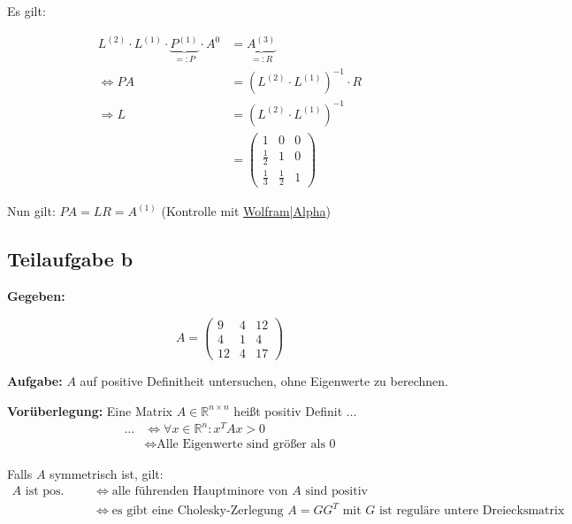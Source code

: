 Es gilt:

\begin{align}
	L^{(2)} \cdot L^{(1)} \cdot \underbrace{P^{(1)}}_{=: P} \cdot A^{0} &= \underbrace{A^{(3)}}_{=: R}\\
	\Leftrightarrow P A &= (L^{(2)} \cdot L^{(1)})^{-1} \cdot R \\
	\Rightarrow L &= (L^{(2)} \cdot L^{(1)})^{-1}\\
	&= \begin{pmatrix}
		1 & 0 & 0\\
		\frac{1}{2} & 1 & 0\\
		\frac{1}{3} & \frac{1}{2} & 1
	\end{pmatrix}
\end{align}

Nun gilt: $P A = L R = A^{(1)}$ (Kontrolle mit \href{http://www.wolframalpha.com/input/?i=%7B%7B1%2C0%2C0%7D%2C%7B0.5%2C1%2C0%7D%2C%7B1%2F3%2C0.5%2C1%7D%7D*%7B%7B6%2C6%2C6%7D%2C%7B0%2C12%2C10%7D%2C%7B0%2C0%2C12%7D%7D}{Wolfram|Alpha})

\subsection*{Teilaufgabe b}

\textbf{Gegeben:}

\[A = 
\begin{pmatrix}
    9 & 4 & 12 \\
    4 & 1  & 4 \\
   12 & 4  & 17
\end{pmatrix}\]

\textbf{Aufgabe:} $A$ auf positive Definitheit untersuchen, ohne Eigenwerte zu berechnen.

\textbf{Vorüberlegung:}
Eine Matrix $A \in \mathbb{R}^{n \times n}$ heißt positiv Definit $\dots$
\begin{align*}
  \dots & \Leftrightarrow \forall x \in \mathbb{R}^n: x^T A x > 0\\
	& \Leftrightarrow \text{Alle Eigenwerte sind größer als 0}
\end{align*}

Falls $A$ symmetrisch ist, gilt:
\begin{align*}
 \text{$A$ ist pos. Definit} & \Leftrightarrow \text{alle führenden Hauptminore von $A$ sind positiv}\\
	& \Leftrightarrow \text{es gibt eine Cholesky-Zerlegung $A=GG^T$ mit $G$ ist reguläre untere Dreiecksmatrix}\\
\end{align*}

